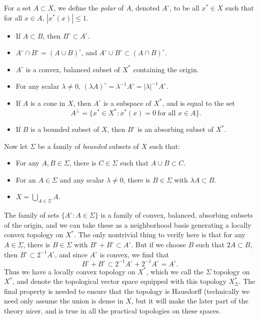 For a set $A \subset X$, we define the \emph{polar} of $A$, denoted $A^\circ$, to be all $x^* \in X$ such that for all $x \in A$, $|x^*(x)| \leq 1$.
%
\begin{itemize}
    \item If $A \subset B$, then $B^\circ \subset A^\circ$.
    \item $A^\circ \cap B^\circ = (A \cup B)^\circ$, and $A^\circ \cup B^\circ \subset (A \cap B)^\circ$.
    \item $A^\circ$ is a convex, balanced subset of $X^*$ containing the origin.
    \item For any scalar $\lambda \neq 0$, $(\lambda A)^\circ = \lambda^{-1} A^\circ = |\lambda|^{-1} A^\circ$.
    \item If $A$ is a cone in $X$, then $A^\circ$ is a subspace of $X^*$, and is equal to the set
    \[ A^\perp = \{ x^* \in X^*: x^*(x) = 0\ \text{for all $x \in A$} \}. \]
    \item If $B$ is a bounded subset of $X$, then $B^\circ$ is an absorbing subset of $X^*$.
\end{itemize}
%
Now let $\Sigma$ be a family of \emph{bounded} subsets of $X$ such that:
%
\begin{itemize}
    \item For any $A,B \in \Sigma$, there is $C \in \Sigma$ such that $A \cup B \subset C$.
    \item For an $A \in \Sigma$ and any scalar $\lambda \neq 0$, there is $B \in \Sigma$ with $\lambda A \subset B$.
    \item $X = \bigcup_{A \in \Sigma} A$.
\end{itemize}
%
The family of sets $\{ A^\circ : A \in \Sigma \}$ is a family of convex, balanced, absorbing subsets of the origin, and we can take these as a neighborhood basis generating a locally convex topology on $X^*$. The only nontrivial thing to verify here is that for any $A \in \Sigma$, there is $B \in \Sigma$ with $B^\circ + B^\circ \subset A^\circ$. But if we choose $B$ such that $2 A \subset B$, then $B^\circ \subset 2^{-1} A^\circ$, and since $A^\circ$ is convex, we find that
%
\[ B^\circ + B^\circ \subset 2^{-1} A^\circ + 2^{-1} A^\circ = A^\circ. \]
%
Thus we have a locally convex topology on $X^*$, which we call the $\Sigma$ topology on $X^*$, and denote the topological vector space equipped with this topology $X^*_\Sigma$. The final property is needed to ensure that the topology is Hausdorff (technically we need only assume the union is dense in $X$, but it will make the later part of the theory nicer, and is true in all the practical topologies on these spaces.


